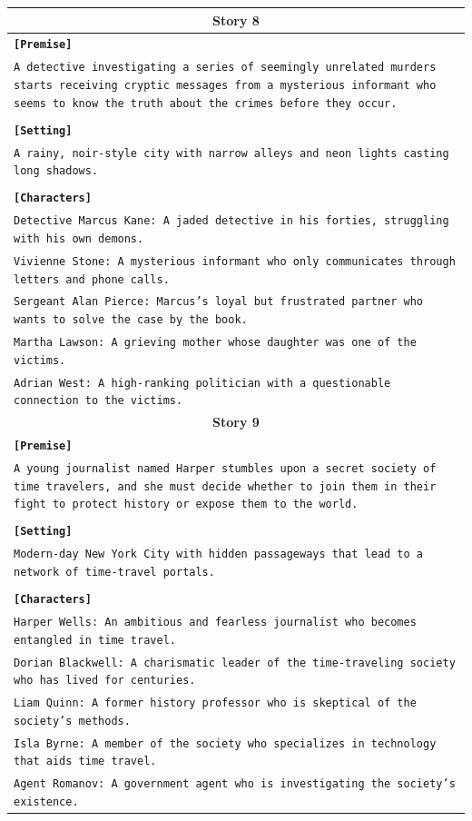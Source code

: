 \documentclass[letterpaper]{article} %
\begin{document}
\begin{small}
\begin{longtable}{p{\textwidth}}
    \multicolumn{1}{c}{\textbf{Story 8}} \\
    \midrule
    \texttt{\textbf{[Premise]}} \\
    \texttt{A detective investigating a series of seemingly unrelated murders starts receiving cryptic messages from a mysterious informant who seems to know the truth about the crimes before they occur.} \\\\
    \texttt{\textbf{[Setting]}} \\
    \texttt{A rainy, noir-style city with narrow alleys and neon lights casting long shadows.} \\\\
    \texttt{\textbf{[Characters]}} \\
    \texttt{Detective Marcus Kane: A jaded detective in his forties, struggling with his own demons.} \\
    \texttt{Vivienne Stone: A mysterious informant who only communicates through letters and phone calls.} \\
    \texttt{Sergeant Alan Pierce: Marcus's loyal but frustrated partner who wants to solve the case by the book.} \\
    \texttt{Martha Lawson: A grieving mother whose daughter was one of the victims.} \\
    \texttt{Adrian West: A high-ranking politician with a questionable connection to the victims.} \\
    \midrule

    \multicolumn{1}{c}{\textbf{Story 9}} \\
    \midrule
    \texttt{\textbf{[Premise]}} \\
    \texttt{A young journalist named Harper stumbles upon a secret society of time travelers, and she must decide whether to join them in their fight to protect history or expose them to the world.} \\\\
    \texttt{\textbf{[Setting]}} \\
    \texttt{Modern-day New York City with hidden passageways that lead to a network of time-travel portals.} \\\\
    \texttt{\textbf{[Characters]}} \\
    \texttt{Harper Wells: An ambitious and fearless journalist who becomes entangled in time travel.} \\
    \texttt{Dorian Blackwell: A charismatic leader of the time-traveling society who has lived for centuries.} \\
    \texttt{Liam Quinn: A former history professor who is skeptical of the society's methods.} \\
    \texttt{Isla Byrne: A member of the society who specializes in technology that aids time travel.} \\
    \texttt{Agent Romanov: A government agent who is investigating the society's existence.} \\
    \midrule
  

\end{longtable}
\end{small}
\end{document}
